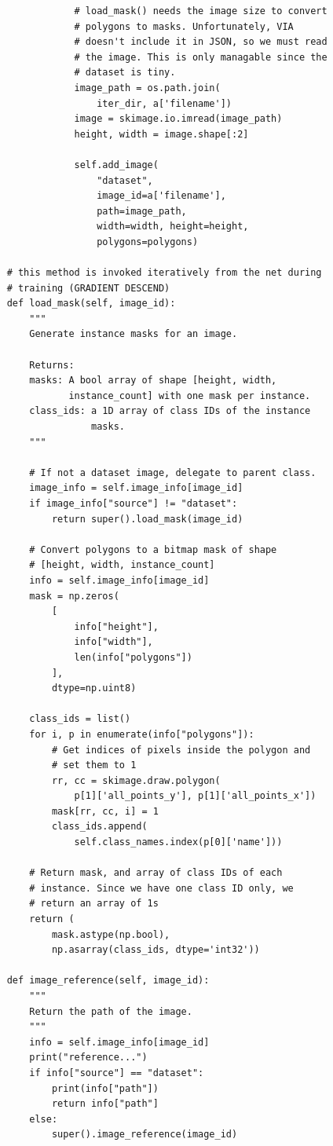 \documentclass[12pt,a4paper]{article}
\begin{document}
\begin{verbatim}
                # load_mask() needs the image size to convert
                # polygons to masks. Unfortunately, VIA
                # doesn't include it in JSON, so we must read
                # the image. This is only managable since the
                # dataset is tiny.
                image_path = os.path.join(
                    iter_dir, a['filename'])
                image = skimage.io.imread(image_path)
                height, width = image.shape[:2]

                self.add_image(
                    "dataset",
                    image_id=a['filename'],
                    path=image_path,
                    width=width, height=height,
                    polygons=polygons)

    # this method is invoked iteratively from the net during
    # training (GRADIENT DESCEND)
    def load_mask(self, image_id):
        """
        Generate instance masks for an image.

        Returns:
        masks: A bool array of shape [height, width,
               instance_count] with one mask per instance.
        class_ids: a 1D array of class IDs of the instance
                   masks.
        """

        # If not a dataset image, delegate to parent class.
        image_info = self.image_info[image_id]
        if image_info["source"] != "dataset":
            return super().load_mask(image_id)

        # Convert polygons to a bitmap mask of shape
        # [height, width, instance_count]
        info = self.image_info[image_id]
        mask = np.zeros(
            [
                info["height"],
                info["width"],
                len(info["polygons"])
            ],
            dtype=np.uint8)

        class_ids = list()
        for i, p in enumerate(info["polygons"]):
            # Get indices of pixels inside the polygon and
            # set them to 1
            rr, cc = skimage.draw.polygon(
                p[1]['all_points_y'], p[1]['all_points_x'])
            mask[rr, cc, i] = 1
            class_ids.append(
                self.class_names.index(p[0]['name']))

        # Return mask, and array of class IDs of each
        # instance. Since we have one class ID only, we
        # return an array of 1s
        return (
            mask.astype(np.bool),
            np.asarray(class_ids, dtype='int32'))

    def image_reference(self, image_id):
        """
        Return the path of the image.
        """
        info = self.image_info[image_id]
        print("reference...")
        if info["source"] == "dataset":
            print(info["path"])
            return info["path"]
        else:
            super().image_reference(image_id)
\end{verbatim}
\end{document}
